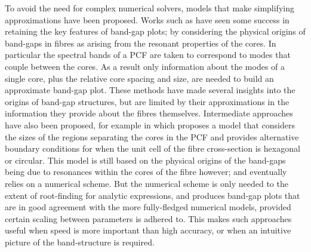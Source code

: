 To avoid the need for complex numerical solvers, models that make simplifying approximations have been proposed.
Works such as  have seen some success in retaining the key features of band-gap plots; by considering the physical origins of band-gaps in fibres as arising from the resonant properties of the cores.
In particular the spectral bands of a PCF are taken to correspond to modes that couple between the cores.
As a result only information about the modes of a single core, plus the relative core spacing and size, are needed to build an approximate band-gap plot.
These methods have made several insights into the origins of band-gap structures, but are limited by their approximations in the information they provide about the fibres themselves.
Intermediate approaches have also been proposed, for example in \cite{birks2006approximate} which proposes a model that considers the sizes of the regions separating the cores in the PCF and provides alternative boundary conditions for when the unit cell of the fibre cross-section is hexagonal or circular.
This model is still based on the physical origins of the band-gaps being due to resonances within the cores of the fibre however; and eventually relies on a numerical scheme.
But the numerical scheme is only needed to the extent of root-finding for analytic expressions, and produces band-gap plots that are in good agreement with the more fully-fledged numerical models, provided certain scaling between parameters is adhered to.
This makes such approaches useful when speed is more important than high accuracy, or when an intuitive picture of the band-structure is required. \newline

